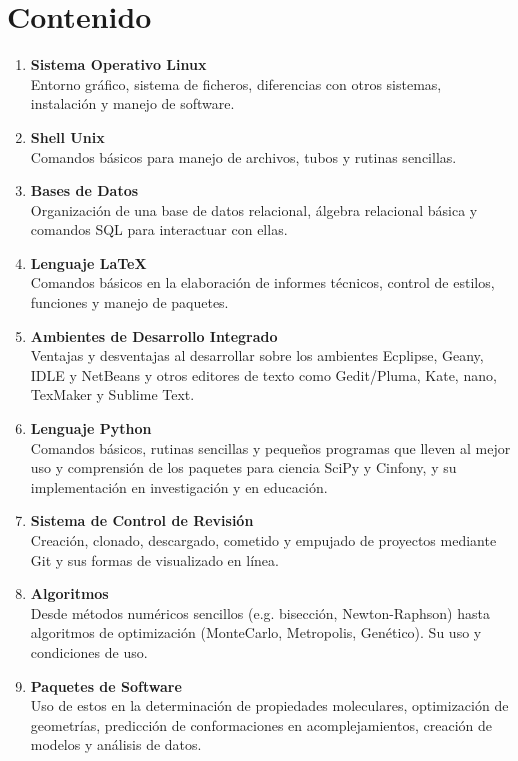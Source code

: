 \documentclass[10pt,letterpaper]{article}
\begin{document}
\section{Contenido}
\begin{enumerate}
\item \textbf{Sistema Operativo Linux}\\ Entorno gr\'afico, sistema de ficheros, diferencias con otros sistemas, instalaci\'on y manejo de software.
\item \textbf{Shell Unix}\\ Comandos b\'asicos para manejo de archivos, tubos y rutinas sencillas.
\item \textbf{Bases de Datos}\\ Organizaci\'on de una base de datos relacional, \'algebra relacional b\'asica y comandos SQL para interactuar con ellas.
\item \textbf{Lenguaje \LaTeX\ }\\ Comandos b\'asicos en la elaboraci\'on de informes t\'ecnicos, control de estilos, funciones y manejo de paquetes.
\item \textbf{Ambientes de Desarrollo Integrado}\\ Ventajas y desventajas al desarrollar sobre los ambientes Ecplipse, Geany, IDLE y NetBeans y otros editores de texto como Gedit/Pluma, Kate, nano, TexMaker y Sublime Text.
\item \textbf{Lenguaje Python}\\ Comandos b\'asicos, rutinas sencillas y peque\~nos programas que lleven al mejor uso y comprensi\'on de los paquetes para ciencia SciPy y Cinfony, y su implementaci\'on en investigaci\'on y en educaci\'on.
\item \textbf{Sistema de Control de Revisi\'on}\\ Creaci\'on, clonado, descargado, cometido y empujado de proyectos mediante Git y sus formas de visualizado en l\'inea.
\item \textbf{Algoritmos}\\ Desde m\'etodos num\'ericos sencillos (e.g. bisecci\'on, Newton-Raphson) hasta algoritmos de optimizaci\'on (MonteCarlo, Metropolis, Gen\'etico). Su uso y condiciones de uso.
\item \textbf{Paquetes de Software}\\ Uso de estos en la determinaci\'on de propiedades moleculares, optimizaci\'on de geometr\'ias, predicci\'on de conformaciones en acomplejamientos, creaci\'on de modelos y an\'alisis de datos.
\end{enumerate}
\end{document}
